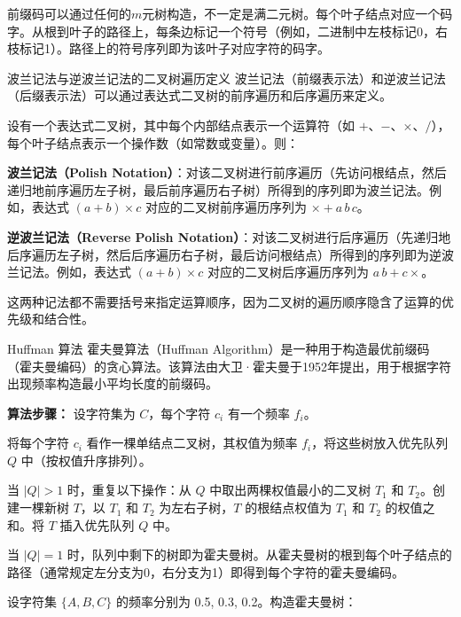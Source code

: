\documentclass[lang=cn,11pt]{elegantbook}
\begin{document}
前缀码可以通过任何的$m$元树构造，不一定是满二元树。每个叶子结点对应一个码字。从根到叶子的路径上，每条边标记一个符号（例如，二进制中左枝标记0，右枝标记1）。路径上的符号序列即为该叶子对应字符的码字。
\begin{definition}{波兰记法与逆波兰记法的二叉树遍历定义}
波兰记法（前缀表示法）和逆波兰记法（后缀表示法）可以通过表达式二叉树的前序遍历和后序遍历来定义。

设有一个表达式二叉树，其中每个内部结点表示一个运算符（如 $+$、$-$、$\times$、$/$），每个叶子结点表示一个操作数（如常数或变量）。则：

\textbf{波兰记法（Polish Notation）}：对该二叉树进行前序遍历（先访问根结点，然后递归地前序遍历左子树，最后前序遍历右子树）所得到的序列即为波兰记法。例如，表达式 $(a + b) \times c$ 对应的二叉树前序遍历序列为 $\times + a\, b\, c$。

\textbf{逆波兰记法（Reverse Polish Notation）}：对该二叉树进行后序遍历（先递归地后序遍历左子树，然后后序遍历右子树，最后访问根结点）所得到的序列即为逆波兰记法。例如，表达式 $(a + b) \times c$ 对应的二叉树后序遍历序列为 $a\, b + c \times$。

这两种记法都不需要括号来指定运算顺序，因为二叉树的遍历顺序隐含了运算的优先级和结合性。
\end{definition}
\begin{definition}{Huffman 算法}
霍夫曼算法（Huffman Algorithm）是一种用于构造最优前缀码（霍夫曼编码）的贪心算法。该算法由大卫·霍夫曼于1952年提出，用于根据字符出现频率构造最小平均长度的前缀码。

\textbf{算法步骤：}
设字符集为 $C$，每个字符 $c_i$ 有一个频率 $f_i$。

将每个字符 $c_i$ 看作一棵单结点二叉树，其权值为频率 $f_i$，将这些树放入优先队列 $Q$ 中（按权值升序排列）。

当 $|Q| > 1$ 时，重复以下操作：从 $Q$ 中取出两棵权值最小的二叉树 $T_1$ 和 $T_2$。创建一棵新树 $T$，以 $T_1$ 和 $T_2$ 为左右子树，$T$ 的根结点权值为 $T_1$ 和 $T_2$ 的权值之和。将 $T$ 插入优先队列 $Q$ 中。

当 $|Q| = 1$ 时，队列中剩下的树即为霍夫曼树。从霍夫曼树的根到每个叶子结点的路径（通常规定左分支为0，右分支为1）即得到每个字符的霍夫曼编码。
\end{definition}
设字符集 $\{A,B,C\}$ 的频率分别为 0.5, 0.3, 0.2。构造霍夫曼树：
\end{document}
